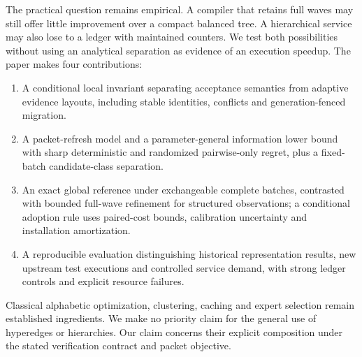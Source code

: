 \documentclass[preprint,12pt]{elsarticle}
\theoremstyle{definition}\newtheorem{definition}[theorem]{Definition}
\begin{document}
The practical question remains empirical. A compiler that retains full
waves may still offer little improvement over a compact balanced tree.
A hierarchical service may also lose to a ledger with maintained counters.
We test both possibilities without using an analytical separation as
evidence of an execution speedup. The paper makes four contributions:
\begin{enumerate}
\item A conditional local invariant separating acceptance semantics from
adaptive evidence layouts, including stable identities, conflicts and
generation-fenced migration.
\item A packet-refresh model and a parameter-general information lower
bound with sharp deterministic and randomized pairwise-only regret,
plus a fixed-batch candidate-class separation.
\item An exact global reference under exchangeable complete batches,
contrasted with bounded full-wave refinement for structured observations;
a conditional adoption rule uses paired-cost bounds, calibration
uncertainty and installation amortization.
\item A reproducible evaluation distinguishing historical representation
results, new upstream test executions and controlled service demand, with
strong ledger controls and explicit resource failures.
\end{enumerate}
Classical alphabetic optimization, clustering, caching and expert selection
remain established ingredients. We make no priority claim for the general
use of hyperedges or hierarchies. Our claim concerns their explicit
composition under the stated verification contract and packet objective.
\end{document}
